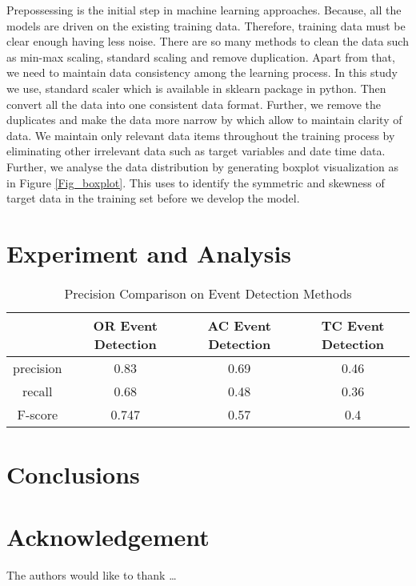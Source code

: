 Prepossessing is the initial step in machine learning approaches.
Because, all the models are driven on the existing training data. 
Therefore, training data must be clear enough having less noise.
There are so many methods to clean the data such as min-max scaling, standard scaling and remove duplication.
Apart from that, we need to maintain data consistency among the learning process.
In this study we use, standard scaler which is available in sklearn package in python.
Then convert all the data into one consistent data format.
Further, we remove the duplicates and make the data more narrow by which allow to maintain clarity of data.
We maintain only relevant data items throughout the training process by eliminating other irrelevant data such as target variables and date time data.
Further, we analyse the data distribution by generating boxplot visualization as in Figure \ref{Fig_boxplot}.
This uses to identify the symmetric and skewness of target data in the training set before we develop the model.

\qwuMarker %

\section{Experiment and Analysis} \label{sec-experiment}


\begin{table}  \centering
  \caption{Precision Comparison on Event Detection Methods}
  \label{tbl:overall-experiments}
  \begin{tabular}{cccc}
\toprule
    & OR Event Detection & AC Event Detection & TC Event Detection \\
\midrule
    precision & 0.83 & 0.69 & 0.46 \\
    recall & 0.68 & 0.48 & 0.36 \\
    F-score & 0.747 & 0.57 & 0.4 \\
\bottomrule
\end{tabular}
\end{table}


\section{Conclusions} \label{sec-conclusions}

\blindtext

\section*{Acknowledgement}

\lipsum[1]


The authors would like to thank \ldots


